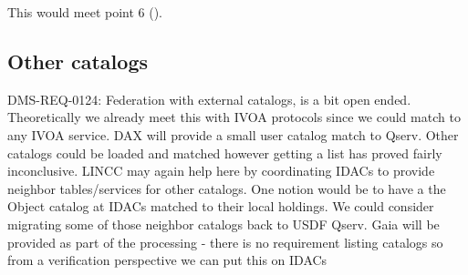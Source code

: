 This would meet  point 6  ().

\subsection{Other catalogs}

DMS-REQ-0124: Federation with external catalogs, is a bit open ended.
Theoretically we already meet this with IVOA protocols since we could match to any IVOA service.
DAX will provide a small user catalog match to Qserv.
Other catalogs could be loaded and matched however getting a list has proved fairly inconclusive.
LINCC may again help here by coordinating IDACs to provide neighbor tables/services for other catalogs.
One notion would be to have a the Object catalog at IDACs matched to their local holdings.
We could consider migrating some of those neighbor catalogs back to USDF Qserv.
Gaia will be provided as part of the processing - there is no requirement listing catalogs so from a verification perspective we can put this on IDACs

